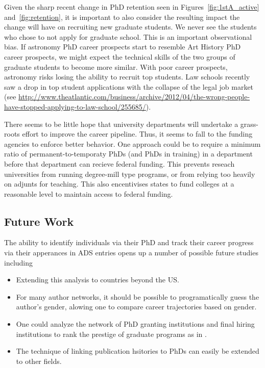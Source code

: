 \documentclass{emulateapj}
\begin{document}
Given the sharp recent change in PhD retention seen in Figures~\ref{fig:1stA_active} and~\ref{fig:retention}, it is important to also consider the resulting impact the change will have on recruiting new graduate students. We never see the students who chose to not apply for graduate school. This is an important observational bias.  If astronomy PhD career prospects start to resemble Art History PhD career prospects, we might expect the technical skills of the two groups of graduate students to become more similar.  With poor career prospects, astronomy risks losing the ability to recruit top students. Law schools recently saw a drop in top student applications with the collapse of the legal job market (see \url{http://www.theatlantic.com/business/archive/2012/04/the-wrong-people-have-stopped-applying-to-law-school/255685/}).  

There seems to be little hope that university departments will undertake a grass-roots effort to improve the career pipeline. Thus, it seems to fall to the funding agencies to enforce better behavior.  One approach could be to require a minimum ratio of permanent-to-temporaty PhDs (and PhDs in training) in a department before that department can recieve federal funding.  This prevents reseach universities from running degree-mill type programs, or from relying too heavily on adjunts for teaching.  This also encentivises states to fund colleges at a reasonable level to maintain access to federal funding.  


\subsection{Future Work}

The ability to identify individuals via their PhD and track their career progress via their apperances in ADS entries opens up a number of possible future studies including
\begin{itemize}
\item{Extending this analysis to countries beyond the US.}
\item{For many author networks, it should be possible to programatically guess the author's gender, alowing one to compare career trajectories based on gender.}
\item{One could analyze the network of PhD granting institutions and final hiring institutions to rank the prestige of graduate programs as in \citet{Clausete15}.}
\item{The technique of linking publication hsitories to PhDs can easily be extended to other fields.}
\end{itemize}
\end{document}
